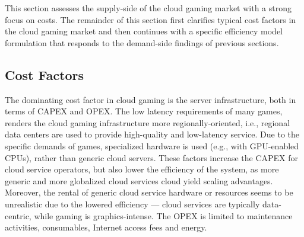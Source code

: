 






This section assesses the supply-side of the cloud gaming market with a strong focus on costs. The remainder of this section first clarifies typical cost factors in the cloud gaming market and then continues with a specific efficiency model formulation that responds to the demand-side findings of previous sections.

\subsection{Cost Factors}

The dominating cost factor in cloud gaming is the server infrastructure, both in terms of \gls{CAPEX} and \gls{OPEX}. The low latency requirements of many games, renders the cloud gaming infrastructure more regionally-oriented, i.e., regional data centers are used to provide high-quality and low-latency service. Due to the specific demands of games, specialized hardware is used (e.g., with GPU-enabled CPUs), rather than generic cloud servers. These factors increase the \gls{CAPEX} for cloud service operators, but also lower the efficiency of the system, as more generic and more globalized cloud services cloud yield scaling advantages. Moreover, the rental of generic cloud service hardware or resources seems to be unrealistic due to the lowered efficiency --- cloud services are typically data-centric, while gaming is graphics-intense. The \gls{OPEX} is limited to maintenance activities, consumables, Internet access fees and energy.

